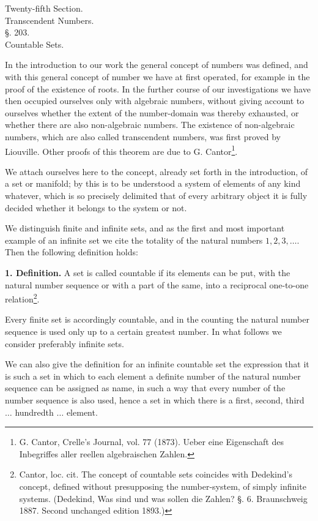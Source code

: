 \documentclass[11pt]{article}
\begin{document}
\begin{center}
{\large Twenty-fifth Section.}\\[0.8em]
{\Large Transcendent Numbers.}\\[1.2em]
{\large §. 203.}\\[0.4em]
{\large Countable Sets.}
\end{center}

In the introduction to our work the general concept of numbers was defined, and with this general concept of number we have at first operated, for example in the proof of the existence of roots. In the further course of our investigations we have then occupied ourselves only with algebraic numbers, without giving account to ourselves whether the extent of the number-domain was thereby exhausted, or whether there are also non-algebraic numbers. The existence of non-algebraic numbers, which are also called transcendent numbers, was first proved by Liouville. Other proofs of this theorem are due to G. Cantor\footnote{G. Cantor, Crelle's Journal, vol. 77 (1873). Ueber eine Eigenschaft des Inbegriffes aller reellen algebraischen Zahlen.}.

We attach ourselves here to the concept, already set forth in the introduction, of a set or manifold; by this is to be understood a system of elements of any kind whatever, which is so precisely delimited that of every arbitrary object it is fully decided whether it belongs to the system or not.

We distinguish finite and infinite sets, and as the first and most important example of an infinite set we cite the totality of the natural numbers $1,2,3,\ldots$. Then the following definition holds:

\textbf{1. Definition.} A set is called countable if its elements can be put, with the natural number sequence
or with a part of the same, into a reciprocal one-to-one relation\footnote{Cantor, loc. cit. The concept of countable sets coincides with Dedekind's concept, defined without presupposing the number-system, of simply infinite systems. (Dedekind, Was sind und was sollen die Zahlen? §. 6. Braunschweig 1887. Second unchanged edition 1893.)}.

Every finite set is accordingly countable, and in the counting the natural number sequence is used only up to a certain greatest number. In what follows we consider preferably infinite sets.

We can also give the definition for an infinite countable set the expression that it is such a set in which to each element a definite number of the natural number sequence can be assigned as name, in such a way that every number of the number sequence is also used, hence a set in which there is a first, second, third $\ldots$ hundredth $\ldots$ element.
\end{document}
